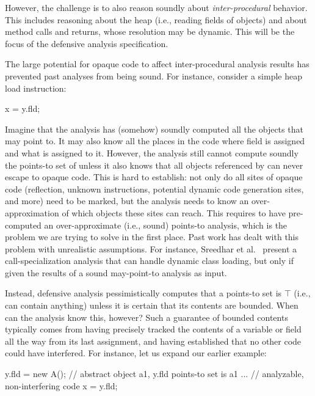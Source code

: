 However, the challenge is to also reason soundly about \emph{inter-procedural} behavior. This includes reasoning about the heap (i.e., reading fields of objects) and about method calls and returns, whose resolution may be dynamic. This will be the focus of the defensive analysis specification.


The large potential for opaque code to affect inter-procedural analysis results has prevented past analyses from being sound. For instance, consider a simple heap load instruction:

\begin{javaBox}
x = y.fld;
\end{javaBox}

Imagine that the analysis has (somehow) soundly computed all the objects that  may point to. It may also know all the places in the code where field  is assigned and what is assigned to it. However, the analysis still cannot compute soundly the points-to set of  unless it also knows that all objects referenced by  can never escape to opaque code. This is hard to establish: not only do all sites of opaque code (reflection, unknown instructions, potential dynamic code generation sites, and more) need to be marked, but the analysis needs to know an over-approximation of which objects these sites can reach. This requires to have pre-computed an over-approximate (i.e., sound) points-to analysis, which is the problem we are trying to solve in the first place. Past work has dealt with this problem with unrealistic assumptions. For instance, Sreedhar et al.~\cite{pldi:2000:Sreedhar} present a call-specialization analysis that can handle dynamic class loading, but only if given the results of a sound may-point-to analysis as input.

Instead, defensive analysis pessimistically computes that a points-to set is $\top$ (i.e., can contain anything) unless it is certain that its contents are bounded. When can the analysis know this, however? Such a guarantee of bounded contents typically comes from having precisely tracked the contents of a variable or field all the way from its last assignment, and having established that no other code could have interfered. For instance, let us expand our earlier example:

\begin{javaBox}
y.fld = new A(); // abstract object a1, y.fld points-to set is {a1}
...              // analyzable, non-interfering code
x = y.fld;
\end{javaBox}

